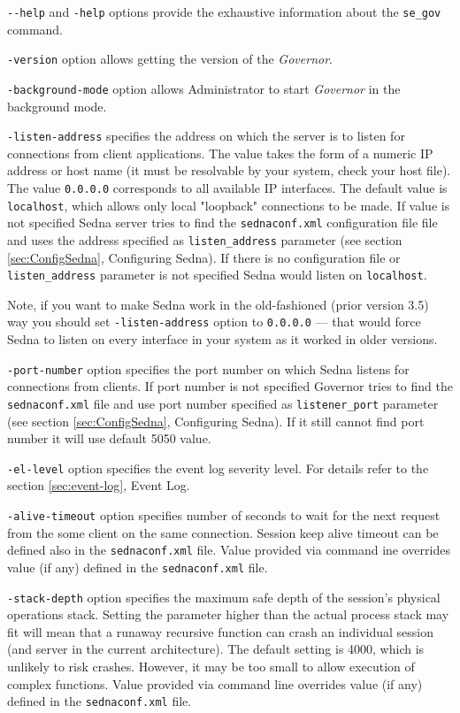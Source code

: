 \documentclass[a4paper,12pt]{article}
\begin{document}
\verb!--help! and \verb!-help! options provide the exhaustive information about
the \verb!se_gov! command.

\verb!-version! option allows getting the version of the \emph{Governor}.

\verb!-background-mode! option allows Administrator to start \emph{Governor} in
the background mode.

\verb!-listen-address! specifies the address on which the server is to listen
for connections from client applications. The value takes the form of a numeric
IP address or host name (it must be resolvable by your system, check your host
file). The value \verb!0.0.0.0! corresponds to all available IP interfaces. The
default value is \verb!localhost!, which allows only local "loopback"
connections to be made. If value is not specified Sedna server tries to find the
\verb!sednaconf.xml! configuration file file and uses the address specified as
\verb!listen_address! parameter (see section \ref{sec:ConfigSedna}, Configuring
Sedna). If there is no configuration file or \verb!listen_address! parameter is
not specified Sedna would listen on \verb!localhost!.

Note, if you want to make Sedna work in the old-fashioned (prior version 3.5)
way you should set \verb!-listen-address! option to \verb!0.0.0.0! --- that
would force Sedna to listen on every interface in your system as it worked in
older versions.

\verb!-port-number! option specifies the port number on which Sedna listens for
connections from clients. If port number is not specified Governor tries to find
the \verb!sednaconf.xml! file and use port number specified as
\verb!listener_port! parameter (see section \ref{sec:ConfigSedna}, Configuring
Sedna). If it still cannot find port number it will use default 5050 value.

\verb!-el-level! option specifies the event log severity level. For details
refer to the section \ref{sec:event-log}, Event Log.

\verb!-alive-timeout! option specifies number of seconds to wait for the next
request from the some client on the same connection. Session keep alive timeout
can be defined also in the \verb!sednaconf.xml! file. Value provided via command
ine overrides value (if any) defined in the \verb!sednaconf.xml! file.

\verb!-stack-depth! option specifies the maximum safe depth of the session's
physical operations stack. Setting the parameter higher than the actual process
stack may fit will mean that a runaway recursive function can crash an
individual session (and server in the current architecture). The default setting
is 4000, which is unlikely to risk crashes. However, it may be too small to
allow execution of complex functions. Value provided via command line overrides
value (if any) defined in the \verb!sednaconf.xml! file.
\end{document}
